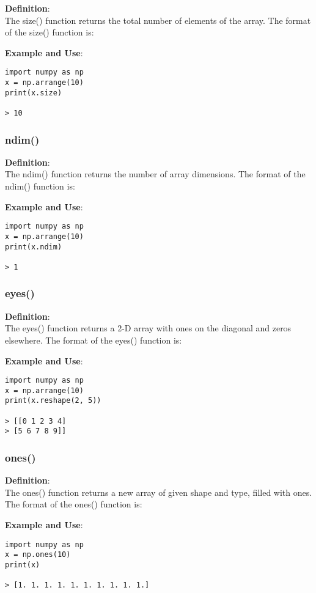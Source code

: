 \documentclass[11pt]{article}
\begin{document}
\textbf{Definition}:\\
The size() function returns the total number of elements of the array. The format of the size() function is:

\textbf{Example and Use}:
\begin{verbatim}
import numpy as np
x = np.arrange(10)
print(x.size)

> 10
\end{verbatim}

\subsubsection{ndim()}

\textbf{Definition}:\\
The ndim() function returns the number of array dimensions. The format of the ndim() function is:

\textbf{Example and Use}:
\begin{verbatim}
import numpy as np
x = np.arrange(10)
print(x.ndim)

> 1
\end{verbatim}

\subsubsection{eyes()}

\textbf{Definition}:\\
The eyes() function returns a 2-D array with ones on the diagonal and zeros elsewhere. The format of the eyes() function is:

\textbf{Example and Use}:
\begin{verbatim}
import numpy as np
x = np.arrange(10)
print(x.reshape(2, 5))

> [[0 1 2 3 4]
> [5 6 7 8 9]]
\end{verbatim}

\subsubsection{ones()}

\textbf{Definition}:\\
The ones() function returns a new array of given shape and type, filled with ones. The format of the ones() function is:

\textbf{Example and Use}:
\begin{verbatim}
import numpy as np
x = np.ones(10)
print(x)

> [1. 1. 1. 1. 1. 1. 1. 1. 1. 1.]
\end{verbatim}
\end{document}
